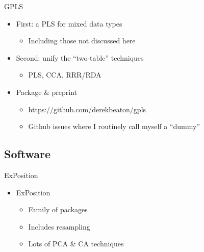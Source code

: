 \documentclass[
  ignorenonframetext,
]{beamer}
\providecommand{\tightlist}{%
  \setlength{\itemsep}{0pt}\setlength{\parskip}{0pt}}
\begin{document}
\begin{frame}{GPLS}
\protect\hypertarget{gpls}{}

\begin{itemize}[<+->]
\tightlist
\item
  First: a PLS for mixed data types

  \begin{itemize}[<+->]
  \tightlist
  \item
    Including those not discussed here
  \end{itemize}
\item
  Second: unify the ``two-table'' techniques

  \begin{itemize}[<+->]
  \tightlist
  \item
    PLS, CCA, RRR/RDA
  \end{itemize}
\item
  Package \& preprint

  \begin{itemize}[<+->]
  \tightlist
  \item
    \url{https://github.com/derekbeaton/gpls}
  \item
    Github issues where I routinely call myself a ``dummy''
  \end{itemize}
\end{itemize}

\end{frame}

\hypertarget{software}{%
\subsection{Software}\label{software}}

\begin{frame}{ExPosition}
\protect\hypertarget{exposition}{}

\begin{itemize}[<+->]
\tightlist
\item
  ExPosition

  \begin{itemize}[<+->]
  \tightlist
  \item
    Family of packages
  \item
    Includes resampling
  \item
    Lots of PCA \& CA techniques
  \end{itemize}
\end{itemize}

\end{frame}
\end{document}
